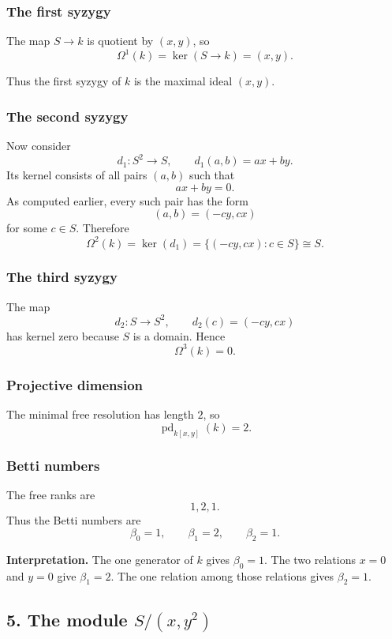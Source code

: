 \documentclass[12pt,a4paper]{article}
\theoremstyle{notespace}
\theoremstyle{definition}
\begin{document}
\subsubsection*{The first syzygy}

The map \(S\to k\) is quotient by \((x,y)\), so
\[
\Omega^1(k)=\ker(S\to k)=(x,y).
\]

Thus the first syzygy of \(k\) is the maximal ideal \((x,y)\).

\subsubsection*{The second syzygy}

Now consider
\[
d_1:S^2\to S, \qquad d_1(a,b)=ax+by.
\]
Its kernel consists of all pairs \((a,b)\) such that
\[
ax+by=0.
\]
As computed earlier, every such pair has the form
\[
(a,b)=(-cy,cx)
\]
for some \(c\in S\).
Therefore
\[
\Omega^2(k)=\ker(d_1)=\{(-cy,cx):c\in S\}\cong S.
\]

\subsubsection*{The third syzygy}

The map
\[
d_2:S\to S^2,\qquad d_2(c)=(-cy,cx)
\]
has kernel zero because \(S\) is a domain.
Hence
\[
\Omega^3(k)=0.
\]

\subsubsection*{Projective dimension}

The minimal free resolution has length \(2\), so
\[
\operatorname{pd}_{k[x,y]}(k)=2.
\]

\subsubsection*{Betti numbers}

The free ranks are
\[
1,2,1.
\]
Thus the Betti numbers are
\[
\beta_0=1,\qquad \beta_1=2,\qquad \beta_2=1.
\]

\medskip

\textbf{Interpretation.}
The one generator of \(k\) gives \(\beta_0=1\).
The two relations \(x=0\) and \(y=0\) give \(\beta_1=2\).
The one relation among those relations gives \(\beta_2=1\).

\subsection{5. The module \(S/(x,y^2)\)}
\end{document}
